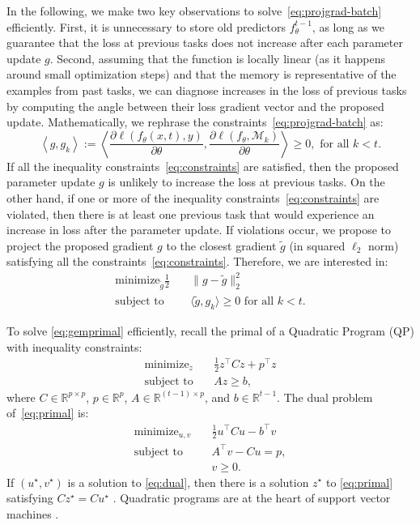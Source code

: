 \documentclass{article}
\begin{document}
In the following, we make two key observations to
solve~\eqref{eq:projgrad-batch} efficiently.  First, it is unnecessary to store
old predictors $f^{t-1}_\theta$, as long as we guarantee that the loss at
previous tasks does not increase after each parameter update $g$.  Second,
assuming that the function is locally linear (as it happens around small
optimization steps) and that the memory is representative of the examples from
past tasks, we can diagnose increases in the loss of previous tasks by
computing the angle between their loss gradient vector and the proposed update.
Mathematically, we rephrase the constraints~\eqref{eq:projgrad-batch} as:
\begin{equation}
\left\langle g, g_{k} \right\rangle := 
\left
\langle
\frac{\partial \ell(f_\theta(x, t), y)}
{\partial \theta}, 
\frac{\partial \ell(f_\theta, \mathcal{M}_k)}
{\partial \theta}
\right\rangle \ge 0, \mbox{ for all } 
 k < t.
\label{eq:constraints}
\end{equation}
If all the inequality constraints~\eqref{eq:constraints} are satisfied, then
the proposed parameter update $g$ is unlikely to increase the loss at previous
tasks.  On the other hand, if one or more of the inequality
constraints~\eqref{eq:constraints} are violated, then there is at least one
previous task that would experience an increase in loss after the parameter
update.  If violations occur, we propose to project the proposed gradient $g$
to the closest gradient $\tilde{g}$ (in squared $\ell_2$ norm) satisfying all
the constraints~\eqref{eq:constraints}. Therefore, we are interested in: 
\begin{align}
\text{minimize}_{\tilde{g}} \frac{1}{2} \quad& \|g - \tilde{g}\|_2^2\nonumber\\
\text{subject to} \quad& \langle \tilde{g}, g_k \rangle \geq 0 \text{ for all } k < t.\label{eq:gemprimal}
\end{align}

To solve \eqref{eq:gemprimal} efficiently, recall the primal of a Quadratic
Program (QP) with inequality constraints:
\begin{align}
    \text{minimize}_z \quad&\frac{1}{2} z^\top C z + p^\top z\nonumber\\
    \text{subject to} \quad&Az \geq b,\label{eq:primal}
\end{align}
where $C \in \mathbb{R}^{p \times p}$, $p\in \mathbb{R}^p$, $A \in
\mathbb{R}^{(t-1) \times p}$, and $b\in\mathbb{R}^{t-1}$.  The dual problem of~\eqref{eq:primal} 
is:
\begin{align}
    \text{minimize}_{u,v}   \quad&\frac{1}{2} u^\top C u - b^\top v\nonumber\\
    \text{subject to}       \quad&A^\top v - Cu = p,\nonumber\\
                                 &v \geq 0.\label{eq:dual}
\end{align}
If $(u^\star, v^\star)$ is a solution to \eqref{eq:dual}, then there is a
solution $z^\star$ to \eqref{eq:primal} satisfying $Cz^\star = Cu^\star$
\citep{dorn1960duality}.
Quadratic programs are at the heart of support vector
machines \citep{scholkopf2001learning}.
\end{document}
